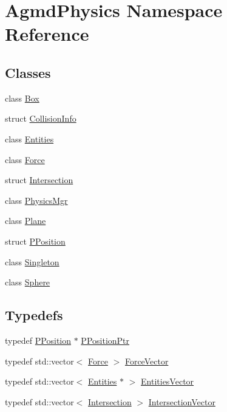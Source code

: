 \hypertarget{namespace_agmd_physics}{\section{Agmd\+Physics Namespace Reference}
\label{namespace_agmd_physics}
}
\subsection*{Classes}
\begin{DoxyCompactItemize}
\item 
class \hyperlink{class_agmd_physics_1_1_box}{Box}
\item 
struct \hyperlink{struct_agmd_physics_1_1_collision_info}{Collision\+Info}
\item 
class \hyperlink{class_agmd_physics_1_1_entities}{Entities}
\item 
class \hyperlink{class_agmd_physics_1_1_force}{Force}
\item 
struct \hyperlink{struct_agmd_physics_1_1_intersection}{Intersection}
\item 
class \hyperlink{class_agmd_physics_1_1_physics_mgr}{Physics\+Mgr}
\item 
class \hyperlink{class_agmd_physics_1_1_plane}{Plane}
\item 
struct \hyperlink{struct_agmd_physics_1_1_p_position}{P\+Position}
\item 
class \hyperlink{class_agmd_physics_1_1_singleton}{Singleton}
\item 
class \hyperlink{class_agmd_physics_1_1_sphere}{Sphere}
\end{DoxyCompactItemize}
\subsection*{Typedefs}
\begin{DoxyCompactItemize}
\item 
typedef \hyperlink{struct_agmd_physics_1_1_p_position}{P\+Position} $\ast$ \hyperlink{namespace_agmd_physics_a72f849383bbb96be02fec5a53333d7fd}{P\+Position\+Ptr}
\item 
typedef std\+::vector$<$ \hyperlink{class_agmd_physics_1_1_force}{Force} $>$ \hyperlink{namespace_agmd_physics_a039d4770849466fe53494a7db5bdc3dc}{Force\+Vector}
\item 
typedef std\+::vector$<$ \hyperlink{class_agmd_physics_1_1_entities}{Entities} $\ast$ $>$ \hyperlink{namespace_agmd_physics_ab6fd06a64e764c2dc23298f0a0351c23}{Entities\+Vector}
\item 
typedef std\+::vector$<$ \hyperlink{struct_agmd_physics_1_1_intersection}{Intersection} $>$ \hyperlink{namespace_agmd_physics_a5b1b4486f555597ab749510899005f8e}{Intersection\+Vector}
\end{DoxyCompactItemize}
